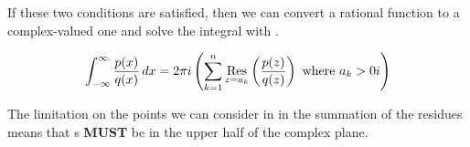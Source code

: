If these two conditions are satisfied, then we can convert a rational function to a complex-valued one and solve the integral with .

\begin{equation}\label{eq:Rational_Function_Complex_Integral}
  \int_{-\infty}^{\infty} \frac{p(x)}{q(x)} \, dx = 2 \pi i \left( \sum_{k=1}^{n} \Residue{\frac{p(z)}{q(z)}}{z=a_{k}} \text{ where } a_{k} > 0i \right)
\end{equation}

The limitation on the points we can consider in in the summation of the residues means that s \textbf{MUST} be in the upper half of the complex plane.

